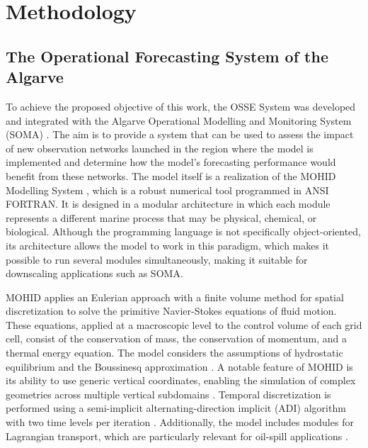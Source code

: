 \section{Methodology} \label{sec:ossedesign_method}
\subsection{The Operational Forecasting System of the Algarve}
To achieve the proposed objective of this work, the OSSE System was developed and integrated with the Algarve Operational Modelling and Monitoring System (SOMA) \parencite{janeiro2017integrating}. The aim is to provide a system that can be used to assess the impact of new observation networks launched in the region where the model is implemented and determine how the model's forecasting performance would benefit from these networks. The model itself is a realization of the MOHID Modelling System \parencite{sobrinho2021improving}, which is a robust numerical tool programmed in ANSI FORTRAN. It is designed in a modular architecture in which each module represents a different marine process that may be physical, chemical, or biological. Although the programming language is not specifically object-oriented, its architecture allows the model to work in this paradigm, which makes it possible to run several modules simultaneously, making it suitable for downscaling applications \parencite{braunschweig2004object} such as SOMA.

MOHID applies an Eulerian approach with a finite volume method for spatial discretization to solve the primitive Navier-Stokes equations of fluid motion. These equations, applied at a macroscopic level to the control volume of each grid cell, consist of the conservation of mass, the conservation of momentum, and a thermal energy equation. The model considers the assumptions of hydrostatic equilibrium and the Boussinesq approximation \parencite{mayeli2021buoyancy}. A notable feature of MOHID is its ability to use generic vertical coordinates, enabling the simulation of complex geometries across multiple vertical subdomains \parencite{martins2001modelling}. Temporal discretization is performed using a semi-implicit alternating-direction implicit (ADI) algorithm with two time levels per iteration \parencite{martins1998three, martins1999modelacao}. Additionally, the model includes modules for Lagrangian transport, which are particularly relevant for oil-spill applications \parencite{janeiro2014enhancing, moreira2023generic}.

